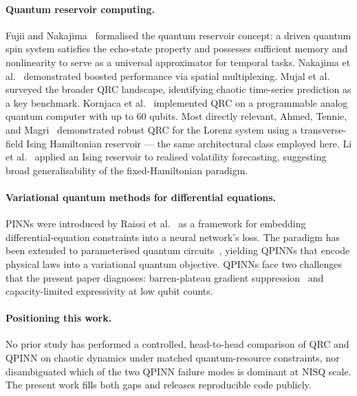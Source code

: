\documentclass[11pt,a4paper]{article}
\begin{document}
\paragraph{Quantum reservoir computing.}
Fujii and Nakajima~\cite{fujii2017} formalised the quantum reservoir
concept: a driven quantum spin system satisfies the echo-state
property and possesses sufficient memory and nonlinearity to serve as
a universal approximator for temporal tasks.
Nakajima et al.~\cite{nakajima2019boosting} demonstrated boosted
performance via spatial multiplexing.
Mujal et al.~\cite{mujal2021} surveyed the broader QRC landscape,
identifying chaotic time-series prediction as a key benchmark.
Kornjaca et al.~\cite{kornjaca2024largescale} implemented QRC on a
programmable analog quantum computer with up to $60$ qubits.
Most directly relevant, Ahmed, Tennie, and
Magri~\cite{ahmed2025robust} demonstrated robust QRC for the Lorenz
system using a transverse-field Ising Hamiltonian reservoir --- the
same architectural class employed here.
Li et al.~\cite{li2025qrc} applied an Ising reservoir to realised
volatility forecasting, suggesting broad generalisability of the
fixed-Hamiltonian paradigm.

\paragraph{Variational quantum methods for differential equations.}
PINNs were introduced by Raissi et al.~\cite{raissi2019} as a
framework for embedding differential-equation constraints into a
neural network's loss. The paradigm has been extended to parameterised
quantum circuits~\cite{qcpinn2024,leung2022qpinn}, yielding QPINNs
that encode physical laws into a variational quantum objective.
QPINNs face two challenges that the present paper diagnoses:
barren-plateau gradient suppression~\cite{mcclean2018} and
capacity-limited expressivity at low qubit counts.

\paragraph{Positioning this work.}
No prior study has performed a controlled, head-to-head comparison of
QRC and QPINN on chaotic dynamics under matched quantum-resource
constraints, nor disambiguated which of the two QPINN failure modes
is dominant at NISQ scale. The present work fills both gaps and
releases reproducible code publicly.

\end{document}
